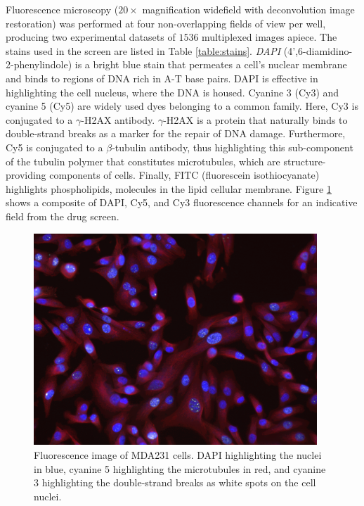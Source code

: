 Fluorescence microscopy ($20\times$ magnification widefield with deconvolution image restoration) was performed at four non-overlapping fields of view per well, producing two experimental datasets of $1536$ multiplexed images apiece. The stains used in the screen are listed in Table \ref{table:stains}. \emph{DAPI} (4',6-diamidino-2-phenylindole) is a bright blue stain that permeates a cell's nuclear membrane and binds to regions of DNA rich in A-T base pairs. DAPI is effective in highlighting the cell nucleus, where the DNA is housed. Cyanine 3 (Cy3) and cyanine 5 (Cy5) are widely used dyes belonging to a common family. Here, Cy3 is conjugated to a $\gamma$-H2AX antibody. $\gamma$-H2AX is a protein that naturally binds to double-strand breaks as a marker for the repair of DNA damage. Furthermore, Cy5 is conjugated to a $\beta$-tubulin antibody, thus highlighting this sub-component of the tubulin polymer that constitutes microtubules, which are structure-providing components of cells. Finally, FITC (fluorescein isothiocyanate) highlights phospholipids, molecules in the lipid cellular membrane. Figure \ref{fig:drug_full_fluorescence} shows a composite of DAPI, Cy5, and Cy3 fluorescence channels for an indicative field from the drug screen.

\begin{figure}[h]
\begin{center}
\includegraphics[width=0.95\textwidth]{img/channels.png}
\caption{Fluorescence image of MDA231 cells. DAPI highlighting the nuclei in blue, cyanine 5 highlighting the microtubules in red, and cyanine 3 highlighting the double-strand breaks as white spots on the cell nuclei.}
\label{fig:drug_full_fluorescence}
\end{center}
\end{figure}

